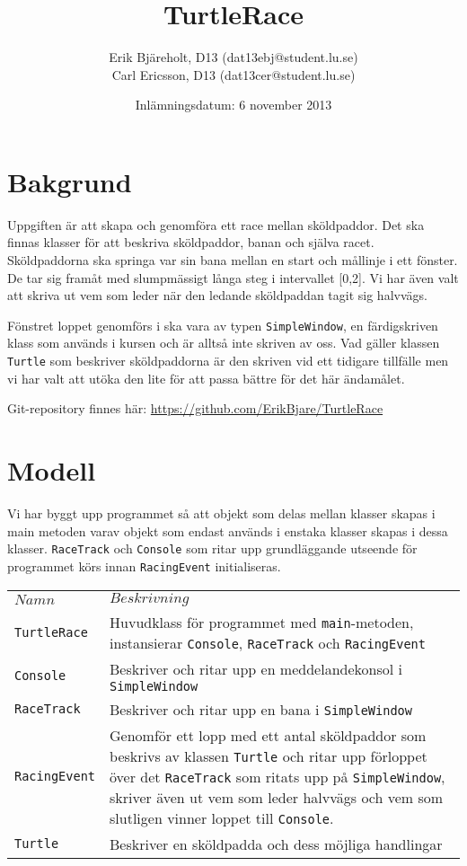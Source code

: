 \documentclass[a4paper]{article}
\title{TurtleRace}
\author{Erik Bjäreholt, D13 (dat13ebj@student.lu.se)\\Carl Ericsson, D13 (dat13cer@student.lu.se)}
\date{Inlämningsdatum: 6 november 2013}        %
\newcommand{\code}[1]{\texttt{#1}}
\begin{document}

\section{Bakgrund}

Uppgiften är att skapa och genomföra ett race mellan sköldpaddor. Det ska finnas klasser för att beskriva sköldpaddor, banan och själva racet. Sköldpaddorna ska springa var sin bana mellan en start och mållinje i ett fönster. De tar sig framåt med slumpmässigt långa steg i intervallet [0,2]. Vi har även valt att skriva ut vem som leder när den ledande sköldpaddan tagit sig halvvägs.

Fönstret loppet genomförs i ska vara av typen \code{SimpleWindow}, en färdigskriven klass som används i kursen och är alltså inte skriven av oss. Vad gäller klassen \code{Turtle} som beskriver sköldpaddorna är den skriven vid ett tidigare tillfälle men vi har valt att utöka den lite för att passa bättre för det här ändamålet.  

Git-repository finnes här: \url{https://github.com/ErikBjare/TurtleRace}

\section{Modell}

Vi har byggt upp programmet så att objekt som delas mellan klasser skapas i main metoden varav objekt som endast används i enstaka klasser skapas i dessa klasser. \code{RaceTrack} och \code{Console} som ritar upp grundläggande utseende för programmet körs innan \code{RacingEvent} initialiseras.

\begin{tabular}{lp{8cm}}
    $Namn$ & $Beskrivning$\\
      
	\code{TurtleRace}  &  
    Huvudklass för programmet med \code{main}-metoden, instansierar \code{Console}, \code{RaceTrack} och \code{RacingEvent}\\

	\code{Console} & 
	Beskriver och ritar upp en meddelandekonsol i \code{SimpleWindow}\\

	\code{RaceTrack} &
	Beskriver och ritar upp en bana i \code{SimpleWindow}\\	  
	      
	\code{RacingEvent} &
	Genomför ett lopp med ett antal sköldpaddor som beskrivs av klassen \code{Turtle} och ritar upp förloppet över det \code{RaceTrack} som ritats upp på \code{SimpleWindow}, skriver även ut vem som leder halvvägs och vem som slutligen vinner loppet till \code{Console}.\\
	
	\code{Turtle} & 
	Beskriver en sköldpadda och dess möjliga handlingar\\
\end{tabular}\\
\end{document}
